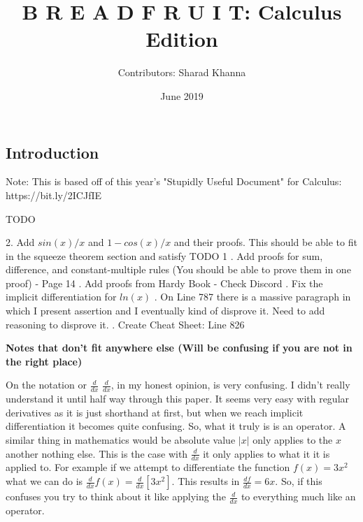 \documentclass{article}
\title{B R E A D F R U I T: Calculus Edition}
\author{Contributors: Sharad Khanna}
\date{June 2019}
\begin{document}
\maketitle
\begin{center}
    \section{Introduction}
\end{center}
Note:  This is based off of this year's "Stupidly Useful Document" for Calculus: https://bit.ly/2ICJfIE
\newline
\newline
\begin{center}TODO\end{center}
2. Add $sin(x)/x$ and $1-cos(x)/x$ and their proofs. This should be able to fit in the squeeze theorem section and satisfy TODO 1
. Add proofs for sum, difference, and constant-multiple rules (You should be able to prove them in one proof) - Page 14
. Add proofs from Hardy Book - Check Discord
. Fix the implicit differentiation for $ln(x)$
. On Line 787 there is a massive paragraph in which I present assertion and I eventually kind of disprove it. Need to add reasoning to disprove it.
. Create Cheat Sheet: Line 826
\newline
\newpage
\begin{center}
    \textbf{Notes that don't fit anywhere else (Will be confusing if you are not in the right place)}
\end{center}
On the notation or $\frac{d}{dx}$
\newline
$\frac{d}{dx}$, in my honest opinion, is very confusing. I didn't really understand it until half way through this paper. It seems very easy with regular derivatives as it is just shorthand at first, but when we reach implicit differentiation it becomes quite confusing. So, what it truly is is an operator. A similar thing in mathematics would be absolute value $|x|$ only applies to the $x$ another nothing else. This is the case with $\frac{d}{dx}$ it only applies to what it it is applied to. For example if we attempt to differentiate the function $f(x) = 3x^2$ what we can do is $\frac{d}{dx}f(x) = \frac{d}{dx}[3x^2]$. This results in $\frac{df}{dx} = 6x$. So, if this confuses you try to think about it like applying the $\frac{d}{dx}$ to everything much like an operator.
\end{document}
